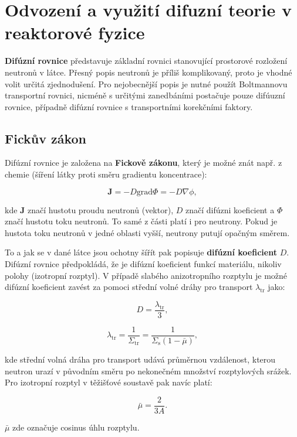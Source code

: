 \section[Difúzní teorie]{Odvození a využití difuzní teorie v reaktorové fyzice}

\textbf{Difúzní rovnice} představuje základní rovnici stanovující prostorové rozložení neutronů v látce. Přesný popis neutronů je příliš komplikovaný, proto je vhodné volit určitá zjednodušení. Pro nejobecnější popis je nutné použít Boltmannovu transportní rovnici, nicméně s určitými zanedbáními postačuje pouze difúuzní rovnice, případně difúzní rovnice s transportními korekčními faktory.

\subsection{Fickův zákon}

Difúzní rovnice je založena na \textbf{Fickově zákonu}, který je možné znát např. z chemie (šíření látky proti směru gradientu koncentrace):

\begin{equation}
    \boxed{ \textbf{J} = - D \text{grad} \Phi = -D \nabla \phi, }
\end{equation}

kde $\textbf{J}$ značí hustotu proudu neutronů (vektor), $D$ značí difúzni koeficient a $\Phi$ značí hustotu toku neutronů. To samé z části platí i pro neutrony. Pokud je hustota toku neutronů v jedné oblasti vyšší, neutrony putují opačným směrem. 

To a jak se v dané látce jsou ochotny šířít pak popisuje \textbf{difúzní koeficient} $D$. Difúzní rovnice předpokládá, že je difúzní koeficient funkcí materiálu, nikoliv polohy (izotropní rozptyl). V případě slabého anizotropního rozptylu je možné difúzní koeficient zavést za pomoci střední volné dráhy pro transport $\lambda_\text{tr}$ jako:

$$ D = \dfrac{\lambda_\text{tr}}{3}, $$

$$ \lambda_\text{tr} = \dfrac{1}{\Sigma_\text{tr}} = \dfrac{1}{\Sigma_\text{s}(1-\bar{\mu})}, $$

kde střední volná dráha pro transport udává průměrnou vzdálenost, kterou neutron urazí v původním směru po nekonečném množství rozptylových srážek. Pro izotropní rozptyl v těžišťové soustavě pak navíc platí:

$$ \bar{\mu} = \dfrac{2}{3A}. $$

$\bar{\mu}$ zde označuje cosinus úhlu rozptylu.

